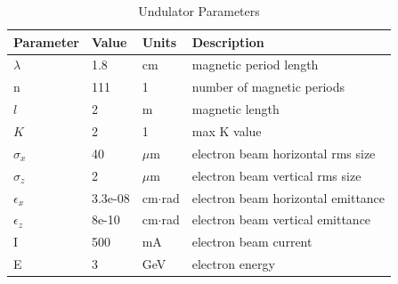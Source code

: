 \documentclass[preprint]{iucr}              %
\begin{document}
\begin{table}\label{ivubiomax}
\caption{Undulator Parameters}
\begin{tabular}{@{}llll@{}}
Parameter       & Value         & Units     & Description                           \\
\hline
$\lambda$       & 1.8           & cm        & magnetic period length                \\
n               & 111           & 1         & number of magnetic periods            \\ 
$l$             & 2             & m         & magnetic length                       \\
$K$             & 2             & 1         & max K value                           \\
$\sigma_x$      & 40            & $\mu$m    & electron beam horizontal rms size     \\
$\sigma_z$      & 2             & $\mu$m    & electron beam vertical rms size       \\
$\epsilon_x$    & 3.3e-08       & cm$\cdot$rad    & electron beam horizontal emittance    \\
$\epsilon_z$    & 8e-10         & cm$\cdot$rad    & electron beam vertical emittance      \\
I               & 500           & mA        & electron beam current                 \\
E               & 3             & GeV       & electron energy                       \\
\end{tabular}
\end{table}
\end{document}
